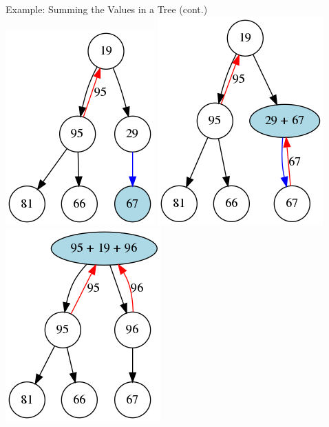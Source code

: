 \documentclass[11pt]{beamer}
\begin{document}
\begin{frame}{Example: Summing the Values in a Tree (cont.)}
\center
\includegraphics[scale=0.28]{graphs/summing_tree_7.png} \hspace{1em}
\includegraphics[scale=0.28]{graphs/summing_tree_8.png} \hspace{1em}
\includegraphics[scale=0.28]{graphs/summing_tree_9.png} \hspace{1em}

\end{frame}
\end{document}

